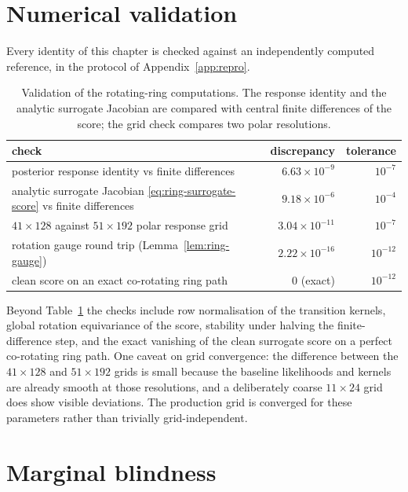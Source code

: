 \section{Numerical validation}\label{sec:ring-validation}

Every identity of this chapter is checked against an independently computed
reference, in the protocol of Appendix~\ref{app:repro}.

\begin{table}[t]\centering
\caption[Validation checks for the rotating-ring package]{Validation of the rotating-ring computations. The response identity
and the analytic surrogate Jacobian are compared with central finite
differences of the score; the grid check compares two polar resolutions.}
\label{tab:ring-validation}
\begin{tabular}{@{}lrr@{}}
\toprule
check & discrepancy & tolerance \\
\midrule
posterior response identity vs finite differences
  & $6.63\times10^{-9}$ & $10^{-7}$ \\
analytic surrogate Jacobian \eqref{eq:ring-surrogate-score} vs finite differences
  & $9.18\times10^{-6}$ & $10^{-4}$ \\
$41\times128$ against $51\times192$ polar response grid
  & $3.04\times10^{-11}$ & $10^{-7}$ \\
rotation gauge round trip (Lemma~\ref{lem:ring-gauge})
  & $2.22\times10^{-16}$ & $10^{-12}$ \\
clean score on an exact co-rotating ring path
  & $0$ (exact) & $10^{-12}$ \\
\bottomrule
\end{tabular}
\end{table}


Beyond Table~\ref{tab:ring-validation} the checks include row normalisation of
the transition kernels, global rotation equivariance of the score, stability
under halving the finite-difference step, and the exact vanishing of the clean
surrogate score on a perfect co-rotating ring path. One caveat on grid
convergence: the difference between the $41\times128$ and $51\times192$ grids
is small because the baseline likelihoods and kernels are already smooth at
those resolutions, and a deliberately coarse $11\times24$ grid does show
visible deviations. The production grid is converged for these parameters
rather than trivially grid-independent.

\section{Marginal blindness}\label{sec:ring-blindness}

